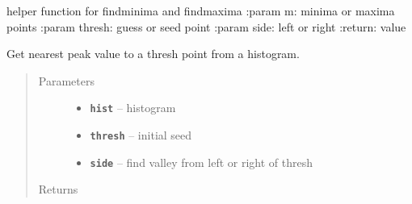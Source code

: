 \documentclass[letterpaper,10pt,english]{sphinxmanual}
\begin{document}

\begin{fulllineitems}
\label{RRtoolbox.lib.arrayops:RRtoolbox.lib.arrayops.basic.find_near}
helper function for findminima and findmaxima
:param m: minima or maxima points
:param thresh: guess or seed point
:param side: left or right
:return: value

\end{fulllineitems}


\begin{fulllineitems}
\label{RRtoolbox.lib.arrayops:RRtoolbox.lib.arrayops.basic.findmaxima}
Get nearest peak value to a thresh point from a histogram.
\begin{quote}\begin{description}
\item[{Parameters}] \leavevmode\begin{itemize}
\item {} 
\textbf{\texttt{hist}} -- histogram

\item {} 
\textbf{\texttt{thresh}} -- initial seed

\item {} 
\textbf{\texttt{side}} -- find valley from left or right of thresh

\end{itemize}

\item[{Returns}] \leavevmode


\end{description}\end{quote}

\end{fulllineitems}

\end{document}
